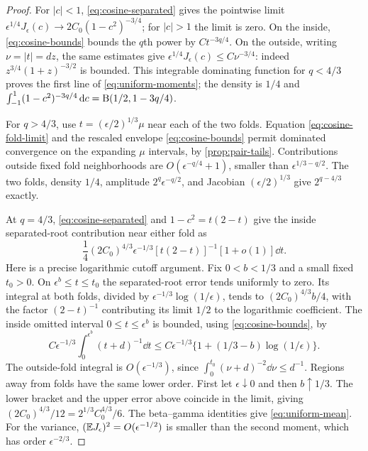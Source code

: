 \begin{proof}
For $|c|<1$, \eqref{eq:cosine-separated} gives the pointwise limit
$\epsilon^{1/4}J_\epsilon(c)\to2C_0(1-c^2)^{-3/4}$;
for $|c|>1$ the limit is zero. On the inside,
\eqref{eq:cosine-bounds} bounds the $q$th power by $Ct^{-3q/4}$.
On the outside, writing $\nu=|t|=dz$, the same estimates give
$\epsilon^{1/4}J_\epsilon(c)\le C\nu^{-3/4}$:
indeed $z^{3/4}(1+z)^{-3/2}$ is bounded.
This integrable dominating function for $q<4/3$ proves the first
line of \eqref{eq:uniform-moments}; the density is $1/4$ and
$\int_{-1}^1(1-c^2)^{-3q/4}\,\mathrm d c=
\operatorname{B}(1/2,1-3q/4)$.

For $q>4/3$, use $t=(\epsilon/2)^{1/3}\mu$ near each of the two folds.
Equation \eqref{eq:cosine-fold-limit} and the rescaled envelope
\eqref{eq:cosine-bounds} permit dominated convergence on the expanding
$\mu$ intervals, by \cref{prop:pair-tails}. Contributions outside
fixed fold neighborhoods are $O(\epsilon^{-q/4}+1)$, smaller than
$\epsilon^{1/3-q/2}$. The two folds, density $1/4$, amplitude
$2^q\epsilon^{-q/2}$, and Jacobian $(\epsilon/2)^{1/3}$ give
$2^{q-4/3}$ exactly.

At $q=4/3$, \eqref{eq:cosine-separated} and $1-c^2=t(2-t)$ give
the inside separated-root contribution near either fold as
\[
 \frac14(2C_0)^{4/3}\epsilon^{-1/3}[t(2-t)]^{-1}
     [1+o(1)]\dd t.
\]
Here is a precise logarithmic cutoff argument. Fix $0<b<1/3$ and
a small fixed $t_0>0$. On $\epsilon^b\le t\le t_0$ the separated-root
error tends uniformly to zero. Its integral at both folds, divided by
$\epsilon^{-1/3}\log(1/\epsilon)$, tends to
$(2C_0)^{4/3}b/4$, with the factor $(2-t)^{-1}$ contributing its
limit $1/2$ to the logarithmic coefficient. The inside omitted interval
$0\le t\le\epsilon^b$ is bounded, using \eqref{eq:cosine-bounds}, by
\[
 C\epsilon^{-1/3}\int_0^{\epsilon^b}(t+d)^{-1}\dd t
 \le C\epsilon^{-1/3}
       \{1+(1/3-b)\log(1/\epsilon)\}.
\]
The outside-fold integral is $O(\epsilon^{-1/3})$, since
$\int_0^{t_0}(\nu+d)^{-2}\dd\nu\le d^{-1}$.
Regions away from folds have the same lower order. First let
$\epsilon\downarrow0$ and then $b\uparrow1/3$. The lower bracket
and the upper error above coincide in the limit, giving
$(2C_0)^{4/3}/12=2^{1/3}C_0^{4/3}/6$.
The beta--gamma identities give \eqref{eq:uniform-mean}.
For the variance, $(\mathbb E J_\epsilon)^2=O(\epsilon^{-1/2})$ is smaller
than the second moment, which has order $\epsilon^{-2/3}$.
\end{proof}

